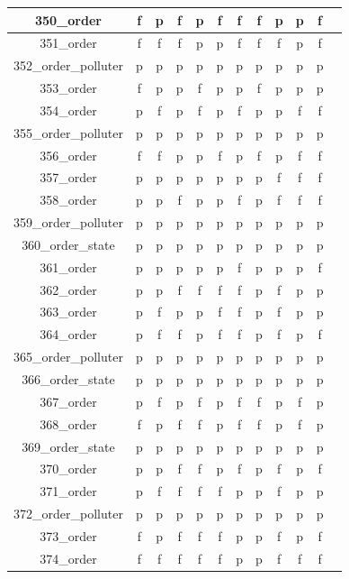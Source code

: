 \documentclass[
fancyheadings, %
%
%
]{stsreprt}
\begin{document}
\begin{longtable}{|c|c|c|c|c|c|c|c|c|c|c|c|}
\hline
350\_order & f & p & f & p & f & f & f & p & p & f \\
\hline
351\_order & f & f & f & p & p & f & f & f & p & f \\
\hline
352\_order\_polluter & p & p & p & p & p & p & p & p & p & p \\
\hline
353\_order & f & p & p & f & p & p & f & p & p & p \\
\hline
354\_order & p & f & p & f & p & f & p & p & f & f \\
\hline
355\_order\_polluter & p & p & p & p & p & p & p & p & p & p \\
\hline
356\_order & f & f & p & p & f & p & f & p & f & f \\
\hline
357\_order & p & p & p & p & p & p & p & f & f & f \\
\hline
358\_order & p & p & f & p & p & f & p & f & f & f \\
\hline
359\_order\_polluter & p & p & p & p & p & p & p & p & p & p \\
\hline
360\_order\_state & p & p & p & p & p & p & p & p & p & p \\
\hline
361\_order & p & p & p & p & p & f & p & p & p & f \\
\hline
362\_order & p & p & f & f & f & f & p & f & p & p \\
\hline
363\_order & p & f & p & p & f & f & p & f & p & p \\
\hline
364\_order & p & f & f & p & f & f & p & f & p & f \\
\hline
365\_order\_polluter & p & p & p & p & p & p & p & p & p & p \\
\hline
366\_order\_state & p & p & p & p & p & p & p & p & p & p \\
\hline
367\_order & p & f & p & f & p & f & f & p & f & p \\
\hline
368\_order & f & p & f & f & p & f & f & p & f & p \\
\hline
369\_order\_state & p & p & p & p & p & p & p & p & p & p \\
\hline
370\_order & p & p & f & f & p & f & p & f & p & f \\
\hline
371\_order & p & f & f & f & f & p & p & f & p & p \\
\hline
372\_order\_polluter & p & p & p & p & p & p & p & p & p & p \\
\hline
373\_order & f & p & f & f & f & p & p & f & p & f \\
\hline
374\_order & f & f & f & f & f & p & p & f & f & f \\
\hline

\end{longtable}
\end{document}
